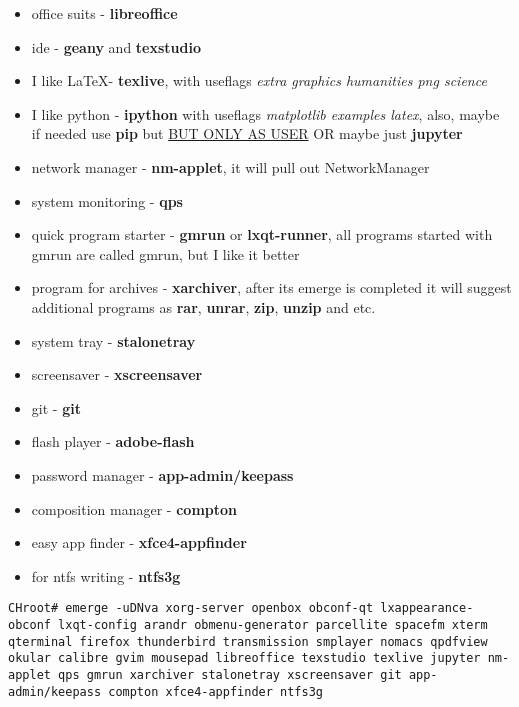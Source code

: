 \documentclass[11pt,a4paper]{article}
\begin{document}
\begin{itemize}
                        \item office suits - \textbf{libreoffice}
                        \item ide - \textbf{geany} and \textbf{texstudio}
                        \item I like \LaTeX - \textbf{texlive}, with useflags \textit{extra graphics humanities png science}
                        \item I like python - \textbf{ipython} with useflags \textit{matplotlib examples latex}, also, maybe if needed use \textbf{pip} but \href{https://wiki.gentoo.org/wiki/Pip#Invocation}{BUT ONLY AS USER} OR maybe just \textbf{jupyter}
                        \item network manager - \textbf{nm-applet}, it will pull out NetworkManager
                        \item system monitoring - \textbf{qps}
                        \item quick program starter - \textbf{gmrun} or \textbf{lxqt-runner}, all programs started with gmrun are called gmrun, but I like it better
                        \item program for archives - \textbf{xarchiver}, after its emerge is completed it will suggest additional programs as \textbf{rar}, \textbf{unrar}, \textbf{zip}, \textbf{unzip} and etc.
                        \item system tray - \textbf{stalonetray}
                        \item screensaver - \textbf{xscreensaver}
                        \item git - \textbf{git}
                        \item flash player - \textbf{adobe-flash}
                        \item password manager - \textbf{app-admin/keepass}
                        \item composition manager - \textbf{compton}
                        \item easy app finder - \textbf{xfce4-appfinder}
                        \item for ntfs writing - \textbf{ntfs3g}
                    \end{itemize}

                    \begin{lstlisting}[style=BashInputCHRoot]
 CHroot# emerge -uDNva xorg-server openbox obconf-qt lxappearance-obconf lxqt-config arandr obmenu-generator parcellite spacefm xterm qterminal firefox thunderbird transmission smplayer nomacs qpdfview okular calibre gvim mousepad libreoffice texstudio texlive jupyter nm-applet qps gmrun xarchiver stalonetray xscreensaver git app-admin/keepass compton xfce4-appfinder ntfs3g
                    \end{lstlisting}
\end{document}
